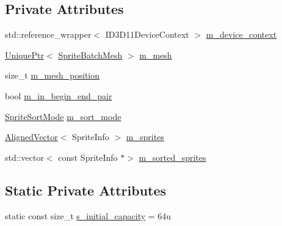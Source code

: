 \subsection*{Private Attributes}
\begin{DoxyCompactItemize}
\item 
std\+::reference\+\_\+wrapper$<$ I\+D3\+D11\+Device\+Context $>$ \mbox{\hyperlink{classmage_1_1rendering_1_1_sprite_batch_1_1_impl_a4072773cc783a776fdfa5cb069403ce4}{m\+\_\+device\+\_\+context}}
\item 
\mbox{\hyperlink{namespacemage_a3316d7143a973e37adf1110f2e80ca31}{Unique\+Ptr}}$<$ \mbox{\hyperlink{classmage_1_1rendering_1_1_sprite_batch_mesh}{Sprite\+Batch\+Mesh}} $>$ \mbox{\hyperlink{classmage_1_1rendering_1_1_sprite_batch_1_1_impl_a6ea37418810939906de6614c6233b4be}{m\+\_\+mesh}}
\item 
size\+\_\+t \mbox{\hyperlink{classmage_1_1rendering_1_1_sprite_batch_1_1_impl_ab8e03aab794373cafdba47da389044a0}{m\+\_\+mesh\+\_\+position}}
\item 
bool \mbox{\hyperlink{classmage_1_1rendering_1_1_sprite_batch_1_1_impl_ad498fe3044bbf1c303119ad4d8edcf7b}{m\+\_\+in\+\_\+begin\+\_\+end\+\_\+pair}}
\item 
\mbox{\hyperlink{namespacemage_1_1rendering_a4fad00dbca0c8d854c765ab831c76055}{Sprite\+Sort\+Mode}} \mbox{\hyperlink{classmage_1_1rendering_1_1_sprite_batch_1_1_impl_a98659f29ee7ea1bdcc8c18ac0dfdcf48}{m\+\_\+sort\+\_\+mode}}
\item 
\mbox{\hyperlink{namespacemage_a8664bfb5ce2179fc64eae9f82c8a5ba8}{Aligned\+Vector}}$<$ Sprite\+Info $>$ \mbox{\hyperlink{classmage_1_1rendering_1_1_sprite_batch_1_1_impl_ad8f211053433418cf5fa6c64402936b3}{m\+\_\+sprites}}
\item 
std\+::vector$<$ const Sprite\+Info $\ast$$>$ \mbox{\hyperlink{classmage_1_1rendering_1_1_sprite_batch_1_1_impl_a1209d58b70713e61bc8f8fc753f9036e}{m\+\_\+sorted\+\_\+sprites}}
\end{DoxyCompactItemize}
\subsection*{Static Private Attributes}
\begin{DoxyCompactItemize}
\item 
static const size\+\_\+t \mbox{\hyperlink{classmage_1_1rendering_1_1_sprite_batch_1_1_impl_a08c5c67bb9af1c630745aba436718ff5}{s\+\_\+initial\+\_\+capacity}} = 64u
\end{DoxyCompactItemize}


